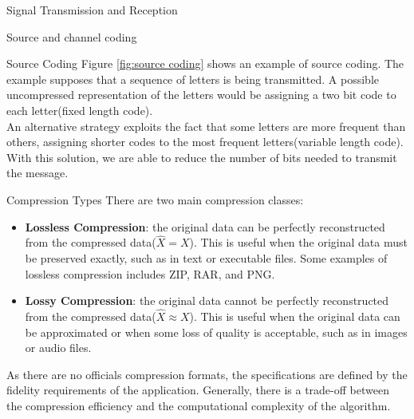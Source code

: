 \begin{section}{Signal Transmission and Reception}
\begin{section}{Source and channel coding}
\begin{subsection}{Source Coding}
        Figure \ref{fig:source coding} shows an example of source coding. The example supposes that
        a sequence of letters is being transmitted. A possible uncompressed representation of the 
        letters would be assigning a two bit code to each letter(fixed length code).\\
        An alternative strategy exploits the fact that some letters are more frequent than others,
        assigning shorter codes to the most frequent letters(variable length code). With this
        solution, we are able to reduce the number of bits needed to transmit the message.\\
        \begin{subsubsection}{Compression Types}
          There are two main compression classes:
          \begin{itemize}
            \item \textbf{Lossless Compression}: the original data can be perfectly reconstructed
              from the compressed data($\hat{X}=X$). This is useful when the original data must be 
              preserved exactly, such as in text or executable files. Some examples of lossless
              compression includes ZIP, RAR, and PNG.
            \item \textbf{Lossy Compression}: the original data cannot be perfectly reconstructed
              from the compressed data($\hat{X}\approx X$). This is useful when the original data 
              can be approximated or when some loss of quality is acceptable, such as in images 
              or audio files.
          \end{itemize}
          As there are no officials compression formats, the specifications are defined by the
          fidelity requirements of the application. Generally, there is a trade-off between the
          compression efficiency and the computational complexity of the algorithm.
        \end{subsubsection}
    \end{subsection}


\end{section}
\end{section}
